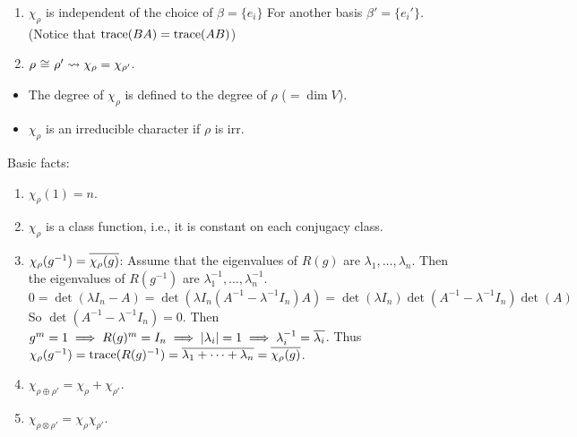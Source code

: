 \begin{remark} \mbox{}
  \begin{enumerate}
    \item $\chi_\rho$ is independent of the choice of $\beta = \{ e_i \}$
      For another basis $\beta' = \{ e_i' \}$.
      (Notice that $\operatorname{trace}(BA) = \operatorname{trace}(AB)$)
    \item $\rho \tikz[anchor=base, baseline]{ \node(rho-equiv) {$\cong$}; }
      \rho' \leadsto \chi_\rho = \chi_{\rho'}$.
  \end{enumerate}
\end{remark}

\begin{definition}\mbox{}
  \begin{itemize}
    \item The degree of $\chi_\rho$ is defined to the degree of $\rho$
      ($ =\dim V$).
    \item $\chi_\rho$ is an irreducible character if $\rho$ is irr.
  \end{itemize}
\end{definition}

Basic facts:
\begin{enumerate}
  \item $\chi_\rho(1) = n$.
  \item $\chi_\rho$ is a class function, i.e., it is constant on each
    conjugacy class.
  \item $\chi_\rho(g^{-1}) = \overline{\chi_\rho(g)}$: Assume that the eigenvalues
    of $R(g)$ are $\lambda_1, \dots, \lambda_n$. Then the eigenvalues of
    $R(g^{-1})$ are $\lambda_1^{-1}, \dots, \lambda_n^{-1}$.
    \[
      0 = \det(\lambda I_n - A) =
      \det(\lambda I_n (A^{-1} - \lambda^{-1}I_n) A) =
      \det(\lambda I_n) \det(A^{-1} - \lambda^{-1} I_n) \det(A)
    \]
    So $\det(A^{-1} - \lambda^{-1} I_n) = 0$.
    Then $g^m = 1 \implies R(g)^m = I_n \implies \lvert\lambda_i\rvert = 1
    \implies \lambda_i^{-1} = \overline{\lambda_i}$. Thus
    $\chi_\rho(g^{-1}) = \operatorname{trace}(R(g)^{-1}) =
    \overline{\lambda_1 + \dots + \lambda_n} = \overline{\chi_\rho(g)}$.
  \item $\chi_{\rho \oplus \rho'} = \chi_{\rho} + \chi_{\rho'}$.
  \item $\chi_{\rho \otimes \rho'} = \chi_{\rho} \chi_{\rho'}$.
\end{enumerate}


